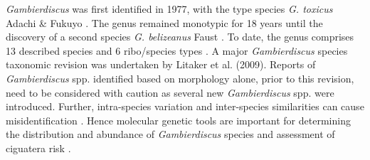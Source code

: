 \documentclass[12pt]{article}
\begin{document}
\emph{Gambierdiscus} was first identified in 1977, with the type species \emph{G. toxicus} Adachi \& Fukuyo \citep{adachi1979thecal}. The genus remained monotypic for 18 years until the discovery of a second species \emph{G. belizeanus} Faust \citep{faust1995observation}. To date, the genus comprises 13 described species and 6 ribo/species types
 \citep{smith2016new,fraga2016gambierdiscus,litaker2010global,adachi1979thecal,faust1995observation,chinain1999morphology,litaker2009taxonomy,nishimura2014morphology,kretzschmar2016characterization,fraga2011gambierdiscus,xu2014distribution,fraga2014genus} .
A major \emph{Gambierdiscus} species taxonomic revision was undertaken by Litaker et al. (2009). Reports of \emph{Gambierdiscus} spp. identified based on morphology alone, prior to this revision, need to be considered with caution as several new \emph{Gambierdiscus} spp. were introduced. Further, intra-species variation and inter-species similarities can cause misidentification \citep{bravo2014cellular,kretzschmar2016characterization,kohli2014high}. Hence molecular genetic tools are important for determining the distribution and abundance of  \textit{Gambierdiscus} species  and assessment of ciguatera risk \citep{kohli2014high,kretzschmar2016characterization}. \\
\end{document}
